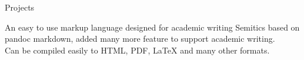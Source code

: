 \documentclass[]{resume-knyte}
\begin{document}
\begin{topic}{Projects}


    {An easy to use markup language designed for academic writing}
    {Semitics based on pandoc markdown, added many more feature to support academic writing.\\
    Can be compiled easily to HTML, PDF, \LaTeX{} and many other formats.}

\end{topic}
\end{document}
